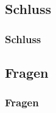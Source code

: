 \begin{frame}
\begin{figure}
\begin{tikzpicture}[font=\sffamily, scale=0.21, transform shape]
		
		
		
		\end{tikzpicture}
	\end{figure}
	
	
\end{frame}

\subsection{Schluss}

\begin{frame}
  \frametitle{Schluss}

\end{frame}

\subsection{Fragen}
\begin{frame}
  \frametitle{Fragen}
\end{frame}



